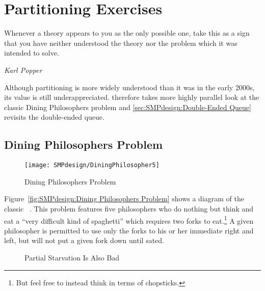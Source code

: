 
\section{Partitioning Exercises}
\label{sec:SMPdesign:Partitioning Exercises}
%
\epigraph{Whenever a theory appears to you as the only possible one,
	  take this as a sign that you have neither understood the theory
	  nor the problem which it was intended to solve.}
	  {\emph{Karl Popper}}

Although partitioning is more widely understood than it was in the early
2000s, its value is still underappreciated.
therefore takes more highly parallel look at the classic Dining
Philosophers problem and
\cref{sec:SMPdesign:Double-Ended Queue}
revisits the double-ended queue.

\subsection{Dining Philosophers Problem}
\label{sec:SMPdesign:Dining Philosophers Problem}

\begin{figure}[tb]
\centering
\texttt{[image: SMPdesign/DiningPhilosopher5]}
\caption{Dining Philosophers Problem}
\end{figure}

Figure~\ref{fig:SMPdesign:Dining Philosophers Problem} shows a diagram
of the classic ~\cite{Dijkstra1971HOoSP}.
This problem features five philosophers who do nothing but think and
eat a ``very difficult kind of spaghetti'' which requires two forks
to eat.\footnote{
	But feel free to instead think in terms of chopsticks.}
A given philosopher is permitted to use only the forks to his or her
immediate right and left, but will not put a given fork down until sated.

\begin{figure*}[tb]
\centering
{}
\caption{Partial Starvation Is Also Bad}
\end{figure*}

